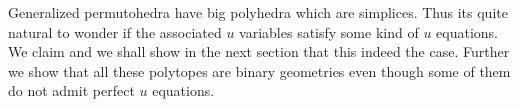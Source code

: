 \documentclass[hidelinks,12pt]{article}
\begin{document}
\vspace{1ex}

Generalized permutohedra have big polyhedra which are simplices. Thus its quite natural to wonder if the associated $u$ variables satisfy some kind of $u$ equations. We claim and we shall show in the next section that this indeed the case. Further we show that all these polytopes are binary geometries even though some of them do not admit perfect $u$ equations. 








\end{document}
